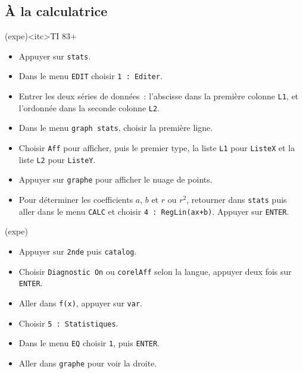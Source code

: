 \documentclass[a4paper, 12pt, garamond]{book}
\begin{document}
\subsection{À la calculatrice}

\begin{tcn}[breakable](expe)<itc>{TI 83+}
	\begin{itemize}
		\item Appuyer sur \texttt{stats}.
		\item Dans le menu \texttt{EDIT} choisir \texttt{1~: Editer}.
		\item Entrer les deux séries de données~: l'abscisse dans la première colonne
		      \texttt{L1}, et l'ordonnée dans la seconde colonne \texttt{L2}.
		\item Dans le menu \texttt{graph stats}, choisir la première ligne.
		\item Choisir \texttt{Aff} pour afficher, puis le premier type, la liste
		      \texttt{L1} pour \texttt{ListeX} et la liste \texttt{L2} pour
		      \texttt{ListeY}.
		\item Appuyer sur \texttt{graphe} pour afficher le nuage de points.
		\item Pour déterminer les coefficients $a$, $b$ et $r$ ou $r^{2}$,
		      retourner dans \texttt{stats} puis aller dans le menu \texttt{CALC} et
		      choisir \texttt{4~: RegLin(ax+b)}. Appuyer sur \texttt{ENTER}.
	\end{itemize}
	\begin{isd}(expe)
		\begin{itemize}
			\item Appuyer sur \texttt{2nde} puis \texttt{catalog}.
			\item Choisir \texttt{Diagnostic On} ou \texttt{corelAff} selon la langue,
			      appuyer deux fois sur \texttt{ENTER}.
		\end{itemize}
		\tcblower
		\begin{itemize}
			\item Aller dans \texttt{f(x)}, appuyer sur \texttt{var}.
			\item Choisir \texttt{5~: Statistiques}.
			\item Dans le menu \texttt{EQ} choisir \texttt{1}, puis \texttt{ENTER}.
			\item Aller dans \texttt{graphe} pour voir la droite.
		\end{itemize}
	\end{isd}
\end{tcn}
\end{document}
